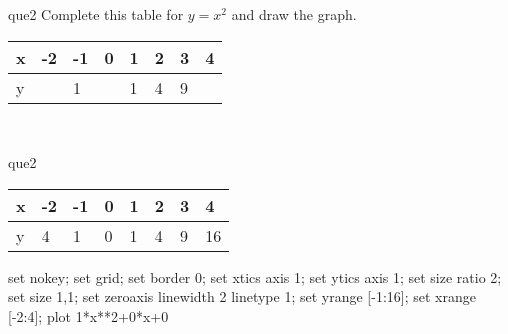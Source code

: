 \documentclass[13.5pt, varwidth=true]{beamer}
\begin{document}
\begin{frame}[shrink=19,fragile]
	\begin{beamercolorbox}[rounded=true, left, shadow=true,wd=14.8cm]{que2}
		 Complete this table for $y = x^{2}$ and draw the graph. \\[0.3cm] \renewcommand{\arraystretch}{1.2}\begin{tabular}{|C|C|C|C|C|C|C|C|} \hline x & -2 & -1 & 0 & 1 & 2 & 3 & 4 \\ \hline y &  & 1 &  & 1 & 4 & 9 & \\ \hline \end{tabular}\\[0.3cm]
	\end{beamercolorbox}
\end{frame}
\begin{frame}[shrink=19,fragile]
	\begin{beamercolorbox}[rounded=true, left, shadow=true,wd=14.8cm]{que2}
		\renewcommand{\arraystretch}{1.2}\begin{tabular}{|C|C|C|C|C|C|C|C|} \hline x & -2 & -1 & 0 & 1 & 2 & 3 & 4 \\ \hline y & 4 & 1 & 0 & 1 & 4 & 9 & 16\\ \hline \end{tabular}\begin{gnuplot}[terminal=pdf] set nokey; set grid; set border 0; set xtics axis 1; set ytics axis 1; set size ratio 2; set size 1,1; set zeroaxis linewidth 2 linetype 1; set yrange [-1:16]; set xrange [-2:4]; plot 1*x**2+0*x+0 \end{gnuplot}
	\end{beamercolorbox}
\end{frame}
\end{document}
